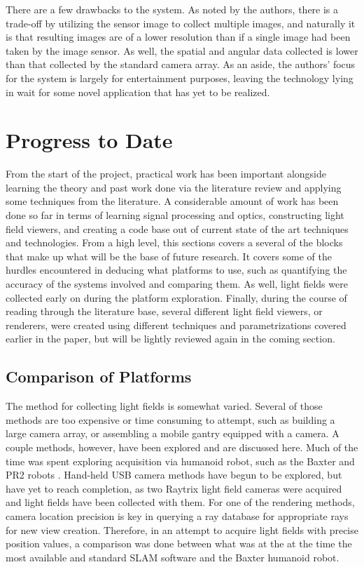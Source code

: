 \documentclass[12pt]{report}
\begin{document}
There are a few drawbacks to the system. As noted by the authors, there is a trade-off by utilizing the sensor image to collect multiple images, and naturally it is that resulting images are of a lower resolution than if a single image had been taken by the image sensor. As well, the spatial and angular data collected is lower than that collected by the standard camera array. As an aside, the authors' focus for the system is largely for entertainment purposes, leaving the technology lying in wait for some novel application that has yet to be realized.

\chapter{Progress to Date}
From the start of the project, practical work has been important alongside learning the theory and past work done via the literature review and applying some techniques from the literature. A considerable amount of work has been done so far in terms of learning signal processing and optics, constructing light field viewers, and creating a code base out of current state of the art techniques and technologies. From a high level, this sections covers a several of the blocks that make up what will be the base of future research. It covers some of the hurdles encountered in deducing what platforms to use, such as quantifying the accuracy of the systems involved and comparing them. As well, light fields were collected early on during the platform exploration. Finally, during the course of reading through the literature base, several different light field viewers, or renderers, were created using different techniques and parametrizations covered earlier in the paper, but will be lightly reviewed again in the coming section.

\section{Comparison of Platforms}
The method for collecting light fields is somewhat varied. Several of those methods are too expensive or time consuming to attempt, such as building a large camera array, or assembling a mobile gantry equipped with a camera. A couple methods, however, have been explored and are discussed here. Much of the time was spent exploring acquisition via humanoid robot, such as the Baxter and PR2 robots \cite{baxter, PR2}. Hand-held USB camera methods have begun to be explored, but have yet to reach completion, as two Raytrix light field cameras were acquired and light fields have been collected with them. For one of the rendering methods, camera location precision is key in querying a ray database for appropriate rays for new view creation. Therefore, in an attempt to acquire light fields with precise position values, a comparison was done between what was at the at the time the most available and standard SLAM software and the Baxter humanoid robot. 
\end{document}
